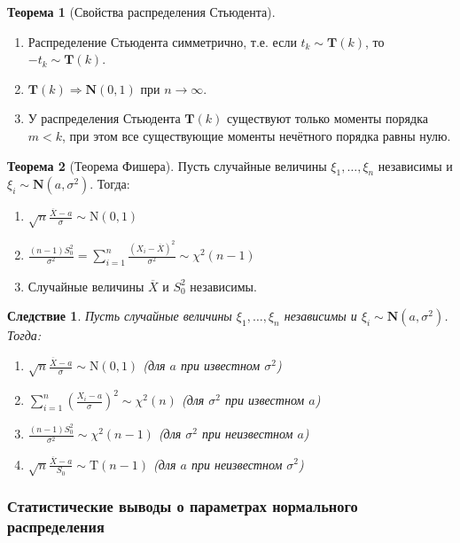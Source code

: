 \documentclass[oneside,final,14pt]{extreport}
\theoremstyle{plain}
\newtheorem*{crlr}{Следствие}
\theoremstyle{definition}
\theoremstyle{named}
\newtheorem*{namedthm}{Теорема}
\begin{document}
\begin{namedthm}[Свойства распределения Стьюдента]
\begin{enumerate}
    \item Распределение Стьюдента симметрично, т.е. если $t_k \sim \mathbf{T}(k)$, то $-t_k \sim \mathbf{T}(k)$.
    \item $\mathbf{T}(k) \Rightarrow \mathbf{N}(0,1)$ при $n \to \infty$.
    \item У распределения Стьюдента $\mathbf{T}(k)$ существуют только моменты порядка $m < k$, при этом все существующие моменты нечётного порядка равны нулю.
\end{enumerate}
\end{namedthm}

\begin{namedthm}[Теорема Фишера]
Пусть случайные величины $\xi_1, \ldots, \xi_n$ независимы и ${\xi_i \sim \mathbf{N}(a,\sigma^{2})}$. Тогда:
\begin{enumerate}
    \item $\sqrt{n} \frac{\overline{X}-a}{\sigma} \sim \mathrm{N}(0,1)$
    \item $\frac{(n-1) S_{0}^{2}}{\sigma^{2}}=\sum\limits_{i=1}^{n} \frac{\left(X_{i}-\overline{X}\right)^{2}}{\sigma^{2}} \sim \chi^{2}(n-1)$
    \item Случайные величины $\overline{X}$ и $S_{0}^{2}$ независимы.
\end{enumerate}
\end{namedthm}
\begin{crlr}
    Пусть случайные величины $\xi_1, \ldots, \xi_n$ независимы и ${\xi_i \sim \mathbf{N}(a,\sigma^{2})}$. Тогда:
    \begin{enumerate}
        \item $\sqrt{n} \frac{\overline{X}-a}{\sigma} \sim \mathrm{N}(0,1)$ (для $a$ при известном $\sigma^{2}$)
        \item $\sum\limits_{i=1}^{n}\left(\frac{X_{i}-a}{\sigma}\right)^{2} \sim \chi^{2}(n)$ (для $\sigma^{2}$ при известном $a$)
        \item $\frac{(n-1) S_{0}^{2}}{\sigma^{2}} \sim \chi^{2}(n-1)$ (для $\sigma^{2}$ при неизвестном $a$)
        \item $\sqrt{n} \frac{\overline{X}-a}{S_{0}} \sim \mathrm{T}(n-1)$ (для $a$ при неизвестном $\sigma^{2}$)
    \end{enumerate}
\end{crlr}

\subsubsection{Статистические выводы о параметрах нормального распределения}
\end{document}

